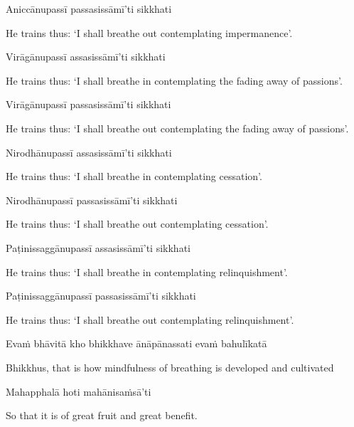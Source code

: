 Aniccānupassī passasissāmī'ti sikkhati

\begin{english}
  He trains thus: `I shall breathe out contemplating impermanence'.
\end{english}

Virāgānupassī assasissāmī'ti sikkhati

\begin{english}
  He trains thus: `I shall breathe in contemplating the fading away of passions'.
\end{english}

Virāgānupassī passasissāmī'ti sikkhati

\begin{english}
  He trains thus: `I shall breathe out contemplating the fading away of passions'.
\end{english}

Nirodhānupassī assasissāmī'ti sikkhati

\begin{english}
  He trains thus: `I shall breathe in contemplating cessation'.
\end{english}

Nirodhānupassī passasissāmī'ti sikkhati

\begin{english}
  He trains thus: `I shall breathe out contemplating cessation'.
\end{english}

Paṭinissaggānupassī assasissāmī'ti sikkhati

\begin{english}
  He trains thus: `I shall breathe in contemplating relinquishment'.
\end{english}

Paṭinissaggānupassī passasissāmī'ti sikkhati

\begin{english}
  He trains thus: `I shall breathe out contemplating relinquishment'.
\end{english}

Evaṁ bhāvitā kho bhikkhave ānāpānassati evaṁ bahulīkatā

\begin{english}
  Bhikkhus, that is how mindfulness of breathing is developed and cultivated
\end{english}

Mahapphalā hoti mahānisaṁsā'ti

\begin{english}
  So that it is of great fruit and great benefit.
\end{english}

